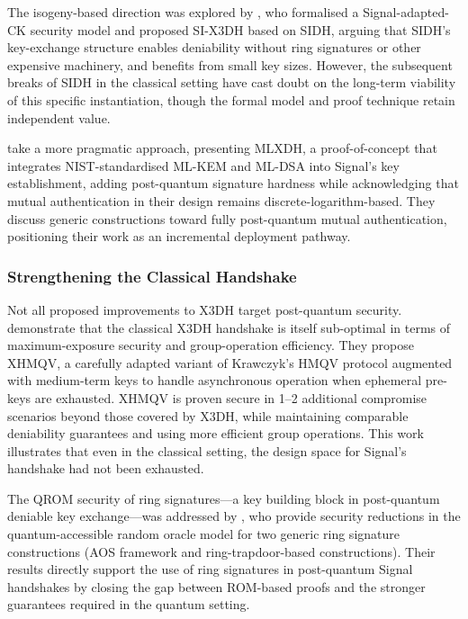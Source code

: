 The isogeny-based direction was explored by \textcite{dobson2022}, who formalised a Signal-adapted-CK security model and proposed SI-X3DH based on SIDH, arguing that SIDH's key-exchange structure enables deniability without ring signatures or other expensive machinery, and benefits from small key sizes. However, the subsequent breaks of SIDH in the classical setting have cast doubt on the long-term viability of this specific instantiation, though the formal model and proof technique retain independent value.

\textcite{angom2025} take a more pragmatic approach, presenting MLXDH, a proof-of-concept that integrates NIST-standardised ML-KEM and ML-DSA into Signal's key establishment, adding post-quantum signature hardness while acknowledging that mutual authentication in their design remains discrete-logarithm-based. They discuss generic constructions toward fully post-quantum mutual authentication, positioning their work as an incremental deployment pathway.

\subsubsection{Strengthening the Classical Handshake}

Not all proposed improvements to X3DH target post-quantum security. \textcite{fiedler2025} demonstrate that the classical X3DH handshake is itself sub-optimal in terms of maximum-exposure security and group-operation efficiency. They propose XHMQV, a carefully adapted variant of Krawczyk's HMQV protocol augmented with medium-term keys to handle asynchronous operation when ephemeral pre-keys are exhausted. XHMQV is proven secure in 1--2 additional compromise scenarios beyond those covered by X3DH, while maintaining comparable deniability guarantees and using more efficient group operations. This work illustrates that even in the classical setting, the design space for Signal's handshake had not been exhausted.

The QROM security of ring signatures—a key building block in post-quantum deniable key exchange—was addressed by \textcite{beckmann2026}, who provide security reductions in the quantum-accessible random oracle model for two generic ring signature constructions (AOS framework and ring-trapdoor-based constructions). Their results directly support the use of ring signatures in post-quantum Signal handshakes by closing the gap between ROM-based proofs and the stronger guarantees required in the quantum setting.

